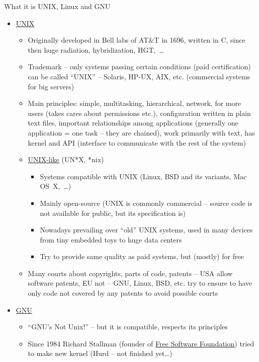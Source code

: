 \documentclass[compress, ucs, xelatex, 11pt, xcolor=svgnames,
  hyperref={
    bookmarks=true,
    unicode=true,
    colorlinks=true,
    pdftitle={Linux, command line and MetaCentrum},
    plainpages=false,
    pdfauthor={Vojtech Zeisek},
    pdfsubject={Course about use of Linux command line, writing shell scripts and using MetaCentrum of CESNET},
    pdfcreator={XeLaTeX},
    pdfkeywords={Linux, GNU, BASH, shell, command line, MetaCentrum},
    linkcolor=DarkRed,
    anchorcolor=DarkBlue,
    citecolor=Indigo,
    filecolor=NavyBlue,
    menucolor=DarkMagenta,
    urlcolor=DarkBlue,
    pdftex},
  url={hyphens, lowtilde} %
  ]{beamer}
\begin{document}
\begin{frame}[allowframebreaks]{What it is UNIX, Linux and GNU}
  \begin{itemize}
    \item \href{https://en.wikipedia.org/wiki/Unix}{UNIX}
    \begin{itemize}
      \item Originally developed in Bell labs of AT\&T in 1696, written in C, since then  huge radiation, hybridization, HGT,~\ldots
      \item Trademark -- only systems passing certain conditions (paid certification) can be called ``UNIX'' -- Solaris, HP-UX, AIX, etc. (commercial systems for big servers)
      \item Main principles: simple, multitasking, hierarchical, network, for more users (takes cares about permissions etc.), configuration written in plain text files, important relationships among applications (generally one application = one task -- they are chained), work primarily with text, has kernel and API (interface to communicate with the rest of the system)
      \item \href{https://en.wikipedia.org/wiki/Unix-like}{UNIX-like} (UN*X, *nix)
      \begin{itemize}
	\item Systems compatible with UNIX (Linux, BSD and its variants, Mac OS~X,~\ldots)
	\item Mainly open-source (UNIX is commonly commercial -- source code is not available for public, but its specification is)
	\item Nowadays prevailing over ``old'' UNIX systems, used in many devices from tiny embedded toys to huge data centers
	\item Try to provide same quality as paid systems, but (mostly) for free
      \end{itemize}
      \item Many courts about copyrights, parts of code, patents -- USA allow software patents, EU not -- GNU, Linux, BSD, etc. try to ensure to have only code not covered by any patents to avoid possible courts
    \end{itemize}
    \item \href{https://www.gnu.org/}{GNU}
    \begin{itemize}
      \item ``GNU's Not Unix!'' -- but it is compatible, respects its principles
      \item Since 1984 Richard Stallman (founder of \href{https://www.fsf.org/}{Free Software Foundation}) tried to make new kernel (Hurd -- not finished yet\ldots)

\end{itemize}
\end{itemize}
\end{frame}
\end{document}
